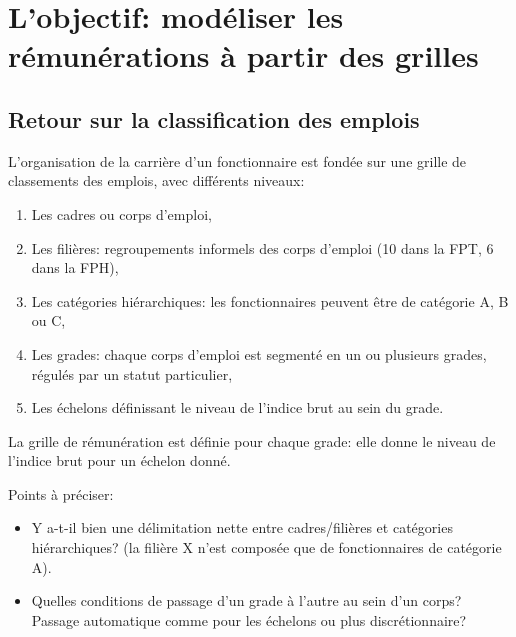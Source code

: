 \documentclass[11pt,a4paper]{article}
\begin{document}
\else \fi



\section{L'objectif: modéliser les rémunérations à partir des grilles}


\subsection*{Retour sur la classification des emplois}

L'organisation de la carrière d'un fonctionnaire est fondée sur une grille de classements des emplois, avec différents niveaux:
 
\begin{enumerate}[leftmargin=1cm ,parsep=0cm,itemsep=0cm,topsep=0cm] 
\item Les cadres ou corps d'emploi,
\item Les filières: regroupements informels des corps d'emploi (10 dans la FPT, 6 dans la FPH), 
\item Les catégories hiérarchiques: les fonctionnaires peuvent être de catégorie A, B ou C,
\item Les grades: chaque corps d'emploi est segmenté en un ou plusieurs grades, régulés par un statut particulier,
\item Les échelons définissant le niveau de l'indice brut au sein du grade. 
\end{enumerate}


\vspace{0.5cm}

La grille de rémunération est définie pour chaque grade: elle donne le niveau de l'indice brut pour un échelon donné. 


Points à préciser: 
\begin{itemize}[leftmargin=1cm ,parsep=0cm,itemsep=0cm,topsep=0cm] 
\item Y a-t-il bien une délimitation nette entre cadres/filières et catégories hiérarchiques? (la filière X n'est composée que de fonctionnaires de catégorie A). 
\item Quelles conditions de passage d'un grade à l'autre au sein d'un corps? Passage automatique comme pour les échelons ou plus discrétionnaire? %
\end{itemize}
\end{document}
